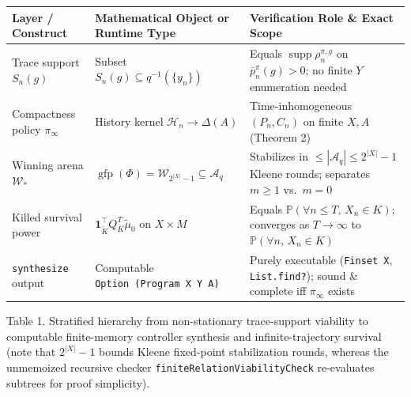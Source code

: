 \documentclass[11pt,a4paper]{article}
\newcounter{none}
\begin{document}
{\def\LTcaptype{none} %
\begin{longtable}[]{@{}
  >{\raggedright\arraybackslash}p{}
  >{\raggedright\arraybackslash}p{}
  >{\raggedright\arraybackslash}p{}@{}}
\toprule\noalign{}
\begin{minipage}[b]{\linewidth}\raggedright
Layer / Construct
\end{minipage} & \begin{minipage}[b]{\linewidth}\raggedright
Mathematical Object or Runtime Type
\end{minipage} & \begin{minipage}[b]{\linewidth}\raggedright
Verification Role \& Exact Scope
\end{minipage} \\
\midrule\noalign{}
\endhead
\bottomrule\noalign{}
\endlastfoot
Trace support \(S_n(g)\) & Subset \(S_n(g) \subseteq q^{-1}(\{y_n\})\) &
Equals \(\operatorname{supp}\rho_n^{\pi,g}\) on
\(\bar{p}_n^\pi(g) > 0\); no finite \(Y\) enumeration needed \\
Compactness policy \(\pi_\infty\) & History kernel
\(\mathcal{H}_n \to \Delta(A)\) & Time-inhomogeneous \((P_n, C_n)\) on
finite \(X, A\) (Theorem 2) \\
Winning arena \(\mathcal{W}_*\) &
\(\operatorname{gfp}(\Phi) = \mathcal{W}_{2^{|X|}-1} \subseteq \mathcal{A}_q\)
& Stabilizes in \(\le |\mathcal{A}_q| \le 2^{|X|}-1\) Kleene rounds;
separates \(m \ge 1\) vs.~\(m=0\) \\
Killed survival power &
\(\mathbf{1}_{\widetilde{K}}^\top Q_K^T \widetilde{\mu}_0\) on
\(X \times M\) & Equals \(\mathbb{P}(\forall n \le T,\, X_n \in K)\);
converges as \(T \to \infty\) to
\(\mathbb{P}(\forall n,\, X_n \in K)\) \\
\texttt{synthesize} output & Computable
\texttt{Option\ (Program\ X\ Y\ A)} & Purely executable
(\texttt{Finset\ X}, \texttt{List.find?}); sound \& complete iff
\(\pi_\infty\) exists \\
\end{longtable}
}

Table 1. Stratified hierarchy from non-stationary trace-support
viability to computable finite-memory controller synthesis and
infinite-trajectory survival (note that \(2^{|X|}-1\) bounds Kleene
fixed-point stabilization rounds, whereas the unmemoized recursive
checker \texttt{finiteRelationViabilityCheck} re-evaluates subtrees for
proof simplicity).
\end{document}
